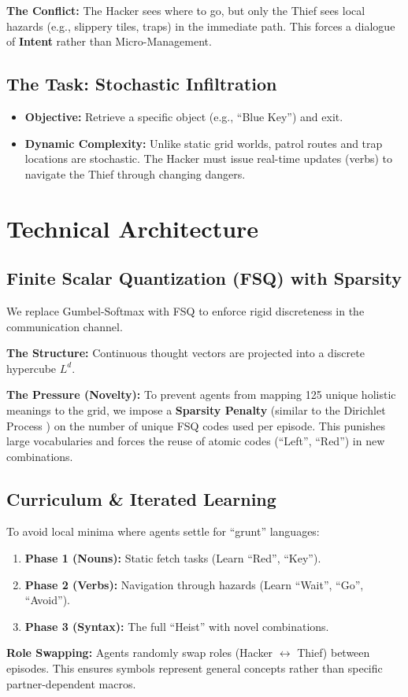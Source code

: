 \documentclass[11pt]{article}
\begin{document}
\textbf{The Conflict:} The Hacker sees where to go, but only the Thief sees local hazards (e.g., slippery tiles, traps) in the immediate path. This forces a dialogue of \textbf{Intent} rather than Micro-Management.

\subsection{The Task: Stochastic Infiltration}
\begin{itemize}
    \item \textbf{Objective:} Retrieve a specific object (e.g., ``Blue Key'') and exit.
    \item \textbf{Dynamic Complexity:} Unlike static grid worlds, patrol routes and trap locations are stochastic. The Hacker must issue real-time updates (verbs) to navigate the Thief through changing dangers.
\end{itemize}

\section{Technical Architecture}

\subsection{Finite Scalar Quantization (FSQ) with Sparsity}
We replace Gumbel-Softmax with FSQ to enforce rigid discreteness in the communication channel. 

\textbf{The Structure:} Continuous thought vectors are projected into a discrete hypercube $L^d$.

\textbf{The Pressure (Novelty):} To prevent agents from mapping 125 unique holistic meanings to the grid, we impose a \textbf{Sparsity Penalty} (similar to the Dirichlet Process \cite{4}) on the number of unique FSQ codes used per episode. This punishes large vocabularies and forces the reuse of atomic codes (``Left'', ``Red'') in new combinations.

\subsection{Curriculum \& Iterated Learning}
To avoid local minima where agents settle for ``grunt'' languages:
\begin{enumerate}
    \item \textbf{Phase 1 (Nouns):} Static fetch tasks (Learn ``Red'', ``Key'').
    \item \textbf{Phase 2 (Verbs):} Navigation through hazards (Learn ``Wait'', ``Go'', ``Avoid'').
    \item \textbf{Phase 3 (Syntax):} The full ``Heist'' with novel combinations.
\end{enumerate}
\textbf{Role Swapping:} Agents randomly swap roles (Hacker $\leftrightarrow$ Thief) between episodes. This ensures symbols represent general concepts rather than specific partner-dependent macros.
\end{document}
